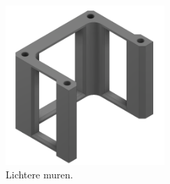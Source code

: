 \begin{minipage}[t]{0.49\textwidth}
    \vspace{0pt}
    \begin{figure}[H]
        \centering
        \includegraphics[height=6cm]{figures/Walls_1_w.png}
        \caption{Lichtere muren.}\label{fig:hollowwalls}
    \end{figure}
\end{minipage}\\

